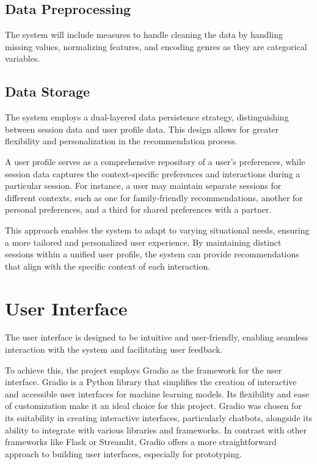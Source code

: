 \subsection{Data Preprocessing}
\label{sec:data_preprocessing_design}

The system will include measures to handle cleaning the data by handling missing values, normalizing features, and encoding genres as they are categorical variables.

\subsection{Data Storage}
\label{sec:data_storage_design}

The system employs a dual-layered data persistence strategy, distinguishing between session data and user profile data. This design allows for greater flexibility and personalization in the recommendation process.

A user profile serves as a comprehensive repository of a user's preferences, while session data captures the context-specific preferences and interactions during a particular session. For instance, a user may maintain separate sessions for different contexts, such as one for family-friendly recommendations, another for personal preferences, and a third for shared preferences with a partner. 

This approach enables the system to adapt to varying situational needs, ensuring a more tailored and personalized user experience. By maintaining distinct sessions within a unified user profile, the system can provide recommendations that align with the specific context of each interaction.

\section{User Interface}
\label{sec:user_interface_design}
The user interface is designed to be intuitive and user-friendly, enabling seamless interaction with the system and facilitating user feedback.

To achieve this, the project employs Gradio \cite{abid2019gradio} as the framework for the user interface. Gradio is a Python library that simplifies the creation of interactive and accessible user interfaces for machine learning models. Its flexibility and ease of customization make it an ideal choice for this project.
Gradio was chosen for its suitability in creating interactive interfaces, particularly chatbots, alongside its ability to integrate with various libraries and frameworks.
In contrast with other frameworks like Flask or Streamlit, Gradio offers a more straightforward approach to building user interfaces, especially for prototyping.


